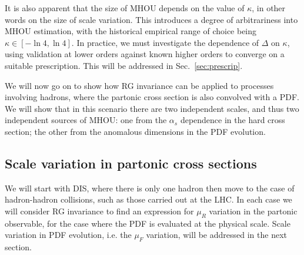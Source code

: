 It is also apparent that the size of MHOU depends on the value of $\kappa$, in other words on the size of scale variation. This introduces a degree of arbitrariness into MHOU estimation, with the historical empirical range of choice being $\kappa \in [-\ln 4, \ln 4]$. In practice, we must investigate the dependence of $\Delta$ on $\kappa$, using validation at lower orders against known higher orders to converge on a suitable prescription.  This will be addressed in Sec.~\ref{sec:prescrip}. 

We will now go on to show how RG invariance can be applied to processes involving hadrons, where the partonic cross section is also convolved with a PDF. We will show that in this scenario there are two independent scales, and thus two independent sources of MHOU: one from the $\alpha_s$ dependence in the hard cross section; the other from the anomalous dimensions in the PDF evolution.

\subsection{Scale variation in partonic cross sections}
\label{subsec:svpartonic}
We will start with DIS, where there is only one hadron then move to the case of hadron-hadron collisions, such as those carried out at the LHC. In each case we will consider RG invariance to find an expression for $\mu_R$ variation in the partonic observable, for the case where the PDF is evaluated at the physical scale. Scale variation in PDF evolution, i.e. the $\mu_F$ variation, will be addressed in the next section.
